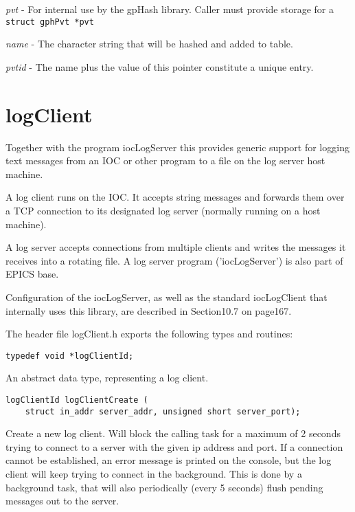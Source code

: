 \begin{description}\item \emph{pvt} - For internal use by the gpHash library. Caller must provide storage for a \verb|struct gphPvt *pvt|

\item \emph{name} - The character string that will be hashed and added to table.

\item \emph{pvtid} - The name plus the value of this pointer constitute a unique entry.

\end{description}\section{logClient}

Together with the program iocLogServer this provides generic support for logging text messages from an IOC or other 
program to a file on the log server host machine.

A log client runs on the IOC. It accepts string messages and forwards them over a TCP connection to its designated log 
server (normally running on a host machine).

A log server accepts connections from multiple clients and writes the messages it receives into a rotating file. A log server 
program ('iocLogServer') is also part of EPICS base.

Configuration of the iocLogServer, as well as the standard iocLogClient that internally uses this library, are described in 
Section10.7 on page167.

The header file logClient.h exports the following types and routines:

\begin{verbatim}typedef void *logClientId;
\end{verbatim}    An abstract data type, representing a log client.

\begin{verbatim}logClientId logClientCreate (
    struct in_addr server_addr, unsigned short server_port);
\end{verbatim}    Create a new log client. Will block the calling task for a maximum of 2 seconds trying to connect to a server with the 
given ip address and port. If a connection cannot be established, an error message is printed on the console, but the log 
client will keep trying to connect in the background. This is done by a background task, that will also periodically (every 
5 seconds) flush pending messages out to the server.

